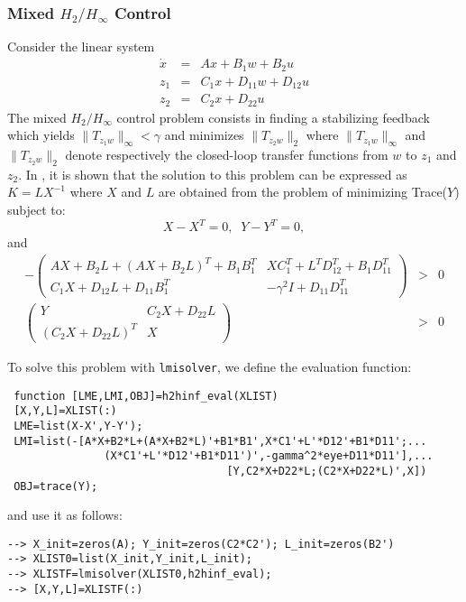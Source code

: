 \documentclass{article}
\begin{document}
\subsubsection{Mixed $H_2/H_{\infty}$ Control}
Consider the linear system
\begin{eqnarray*}
\dot{x}&=&Ax+B_1w+B_2u\\
z_1&=&C_1x+D_{11}w+D_{12}u\\
z_2&=&C_2x+D_{22}u
\end{eqnarray*}
The mixed $H_2/H_{\infty}$ control problem consists in finding
a stabilizing feedback which yields $\|T_{z_1w}\|_{\infty}<\gamma$ and
minimizes $\|T_{z_2w}\|_2$ where $\|T_{z_1w}\|_{\infty}$ and
$\|T_{z_2w}\|_2$ denote respectively the closed-loop transfer
functions from $w$ to $z_1$ and $z_2$. In \cite{khargo}, it is
shown that the solution to this problem can be expressed as
$K=LX^{-1}$ where $X$ and $L$ are obtained from the problem of
minimizing Trace($Y$) subject to:
\[
X-X^T=0,\;\; Y-Y^T=0,
\]
and
\begin{eqnarray*}
-\left( \begin{array} {cc}
AX+B_2L+(AX+B_2L)^T+B_1B_1^T & XC_1^T+L^TD_{12}^T+B_1D_{11}^T \\
C_1X+D_{12}L+D_{11}B_1^T & -\gamma^2 I + D_{11}D_{11}^T
\end{array} \right) & > & 0 \\
\left( \begin{array} {cc}Y & C_2X+D_{22}L\\(C_2X+D_{22}L)^T&X
\end{array} \right) & > & 0
\end{eqnarray*}

To solve this problem with {\tt lmisolver}, we define the 
evaluation function:
\begin{verbatim}
 function [LME,LMI,OBJ]=h2hinf_eval(XLIST)
 [X,Y,L]=XLIST(:)
 LME=list(X-X',Y-Y');
 LMI=list(-[A*X+B2*L+(A*X+B2*L)'+B1*B1',X*C1'+L'*D12'+B1*D11';...
               (X*C1'+L'*D12'+B1*D11')',-gamma^2*eye+D11*D11'],...
                                  [Y,C2*X+D22*L;(C2*X+D22*L)',X])
 OBJ=trace(Y);
\end{verbatim}
and use it as follows:
\begin{verbatim}
--> X_init=zeros(A); Y_init=zeros(C2*C2'); L_init=zeros(B2')
--> XLIST0=list(X_init,Y_init,L_init);
--> XLISTF=lmisolver(XLIST0,h2hinf_eval);
--> [X,Y,L]=XLISTF(:)
\end{verbatim}
\end{document}
